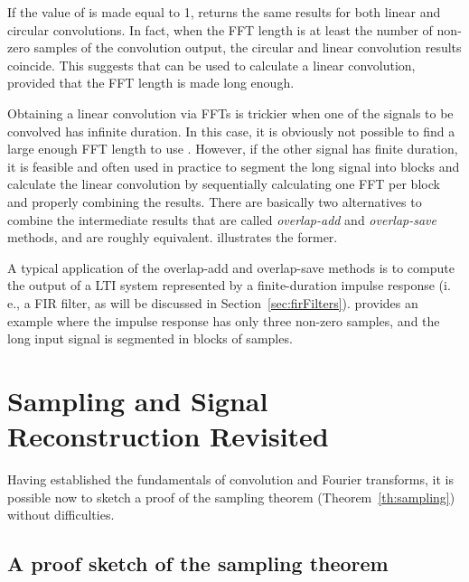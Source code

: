 If the value of  is made equal to 1, 
 returns the same results for both linear and
circular convolutions. In fact, when the FFT length is at least the number of non-zero
samples of the convolution output, the circular and linear convolution results coincide.
This suggests that  can be used to calculate a
linear convolution, provided that the FFT length is made long enough.

Obtaining a linear convolution via FFTs is trickier when one of the signals to be convolved has infinite duration. In this case, it is obviously not possible to find a large enough FFT
length to use . However, if the other signal has
finite duration,  it is feasible and often used in practice to segment the long signal
into blocks and calculate the linear convolution by sequentially calculating one FFT
per block and properly combining the results. There are basically two alternatives to combine
the intermediate results that are called \emph{overlap-add} and \emph{overlap-save} methods,
 and are roughly equivalent.
  illustrates the former.


A typical application of the overlap-add and overlap-save methods is to compute the output of a LTI system represented by a finite-duration impulse response (i.\,e., a FIR filter, as will be discussed in Section~\ref{sec:firFilters}). 
 provides an example where the impulse response has only three non-zero samples, and the long input signal is segmented in blocks of  samples.

\section{{\akadvanced} Sampling and Signal Reconstruction Revisited}
\label{sec:samplingRevisited}

Having established the fundamentals of convolution and Fourier transforms, it is
possible now to sketch a proof of the sampling theorem (Theorem~\ref{th:sampling}) without difficulties.

\subsection{A proof sketch of the sampling theorem}


